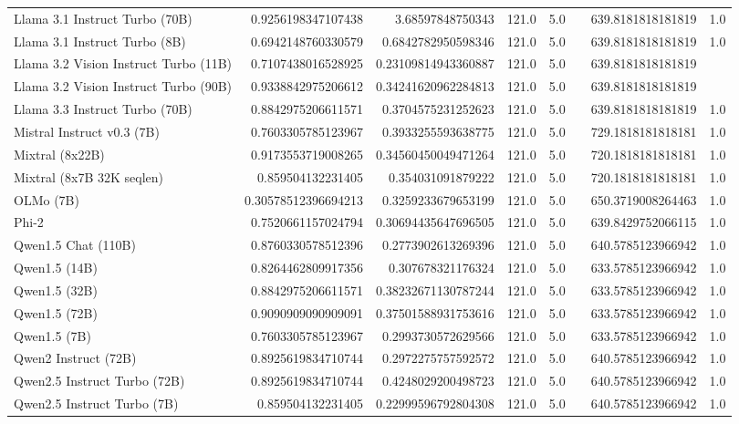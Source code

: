 \begin{table}[htp]
{\begin{tabular}{lrrrrrrr}
Llama 3.1 Instruct Turbo (70B) & 0.9256198347107438 & 3.68597848750343 & 121.0 & 5.0 &  & 639.8181818181819 & 1.0 \\
Llama 3.1 Instruct Turbo (8B) & 0.6942148760330579 & 0.6842782950598346 & 121.0 & 5.0 &  & 639.8181818181819 & 1.0 \\
Llama 3.2 Vision Instruct Turbo (11B) & 0.7107438016528925 & 0.23109814943360887 & 121.0 & 5.0 &  & 639.8181818181819 &  \\
Llama 3.2 Vision Instruct Turbo (90B) & 0.9338842975206612 & 0.34241620962284813 & 121.0 & 5.0 &  & 639.8181818181819 &  \\
Llama 3.3 Instruct Turbo (70B) & 0.8842975206611571 & 0.3704575231252623 & 121.0 & 5.0 &  & 639.8181818181819 & 1.0 \\
Mistral Instruct v0.3 (7B) & 0.7603305785123967 & 0.3933255593638775 & 121.0 & 5.0 &  & 729.1818181818181 & 1.0 \\
Mixtral (8x22B) & 0.9173553719008265 & 0.34560450049471264 & 121.0 & 5.0 &  & 720.1818181818181 & 1.0 \\
Mixtral (8x7B 32K seqlen) & 0.859504132231405 & 0.354031091879222 & 121.0 & 5.0 &  & 720.1818181818181 & 1.0 \\
OLMo (7B) & 0.30578512396694213 & 0.3259233679653199 & 121.0 & 5.0 &  & 650.3719008264463 & 1.0 \\
Phi-2 & 0.7520661157024794 & 0.30694435647696505 & 121.0 & 5.0 &  & 639.8429752066115 & 1.0 \\
Qwen1.5 Chat (110B) & 0.8760330578512396 & 0.2773902613269396 & 121.0 & 5.0 &  & 640.5785123966942 & 1.0 \\
Qwen1.5 (14B) & 0.8264462809917356 & 0.307678321176324 & 121.0 & 5.0 &  & 633.5785123966942 & 1.0 \\
Qwen1.5 (32B) & 0.8842975206611571 & 0.38232671130787244 & 121.0 & 5.0 &  & 633.5785123966942 & 1.0 \\
Qwen1.5 (72B) & 0.9090909090909091 & 0.37501588931753616 & 121.0 & 5.0 &  & 633.5785123966942 & 1.0 \\
Qwen1.5 (7B) & 0.7603305785123967 & 0.2993730572629566 & 121.0 & 5.0 &  & 633.5785123966942 & 1.0 \\
Qwen2 Instruct (72B) & 0.8925619834710744 & 0.2972275757592572 & 121.0 & 5.0 &  & 640.5785123966942 & 1.0 \\
Qwen2.5 Instruct Turbo (72B) & 0.8925619834710744 & 0.4248029200498723 & 121.0 & 5.0 &  & 640.5785123966942 & 1.0 \\
Qwen2.5 Instruct Turbo (7B) & 0.859504132231405 & 0.22999596792804308 & 121.0 & 5.0 &  & 640.5785123966942 & 1.0 \\

\end{tabular}}
\end{table}
